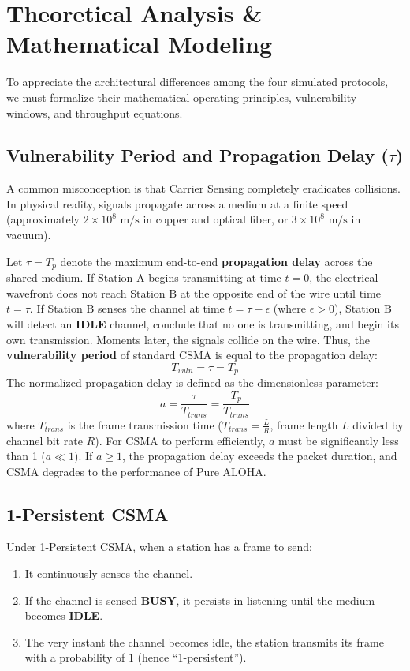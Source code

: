 \documentclass[12pt, a4paper]{article}
\begin{document}
\section{Theoretical Analysis \& Mathematical Modeling}

To appreciate the architectural differences among the four simulated protocols, we must formalize their mathematical operating principles, vulnerability windows, and throughput equations.

\subsection{Vulnerability Period and Propagation Delay ($\tau$)}
A common misconception is that Carrier Sensing completely eradicates collisions. In physical reality, signals propagate across a medium at a finite speed (approximately $2 \times 10^8 \text{ m/s}$ in copper and optical fiber, or $3 \times 10^8 \text{ m/s}$ in vacuum). 

Let $\tau = T_p$ denote the maximum end-to-end \textbf{propagation delay} across the shared medium. If Station A begins transmitting at time $t = 0$, the electrical wavefront does not reach Station B at the opposite end of the wire until time $t = \tau$. If Station B senses the channel at time $t = \tau - \epsilon$ (where $\epsilon > 0$), Station B will detect an \textbf{IDLE} channel, conclude that no one is transmitting, and begin its own transmission. Moments later, the signals collide on the wire. Thus, the \textbf{vulnerability period} of standard CSMA is equal to the propagation delay:
\begin{equation}
    T_{vuln} = \tau = T_p
\end{equation}
The normalized propagation delay is defined as the dimensionless parameter:
\begin{equation}
    a = \frac{\tau}{T_{trans}} = \frac{T_p}{T_{trans}}
\end{equation}
where $T_{trans}$ is the frame transmission time ($T_{trans} = \frac{L}{R}$, frame length $L$ divided by channel bit rate $R$). For CSMA to perform efficiently, $a$ must be significantly less than 1 ($a \ll 1$). If $a \ge 1$, the propagation delay exceeds the packet duration, and CSMA degrades to the performance of Pure ALOHA.

\subsection{1-Persistent CSMA}
Under 1-Persistent CSMA, when a station has a frame to send:
\begin{enumerate}
    \item It continuously senses the channel.
    \item If the channel is sensed \textbf{BUSY}, it persists in listening until the medium becomes \textbf{IDLE}.
    \item The very instant the channel becomes idle, the station transmits its frame with a probability of $1$ (hence ``1-persistent'').
\end{enumerate}
\end{document}
